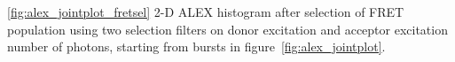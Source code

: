 \ref{fig:alex_jointplot_fretsel} 2-D ALEX histogram after selection of FRET population using two selection filters on donor excitation and acceptor excitation number of photons, starting from bursts in figure~\ref{fig:alex_jointplot}.
